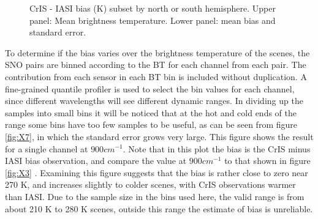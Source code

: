 \documentclass[twocolumn,10pt]{article}
\begin{document}
\begin{figure}[htb]
  \centering
\hfill
  \caption{CrIS - IASI bias (K) subset by north or south hemisphere. Upper panel: Mean brightness temperature. Lower panel: mean bias and standard error.}%
  \label{fig:X6}
\end{figure}

To determine if the bias varies over the brightness temperature of the scenes, the SNO pairs are binned according to the BT for each channel from each pair. The contribution from each sensor in each BT bin is included without duplication.  A fine-grained quantile profiler is used to select the bin values for each channel, since different wavelengths will see different dynamic ranges.  In dividing up the samples into small bins it will be noticed that at the hot and cold ends of the range some bins have too few samples to be useful, as can be seen from figure \ref{fig:X7}, in which the standard error grows very large. This figure shows the result for a single channel at $900 cm^{-1}$. Note that in this plot the bias is the CrIS minus IASI bias observation, and compare the value at $900 cm^{-1}$ to that shown in figure \ref{fig:X3} . Examining this figure suggests that the bias is rather close to zero near 270 K, and increases slightly to colder scenes, with CrIS observations warmer than IASI. Due to the sample size in the bins used here, the valid range is from about 210 K to 280 K scenes, outside this range the estimate of bias is unreliable.
\end{document}
